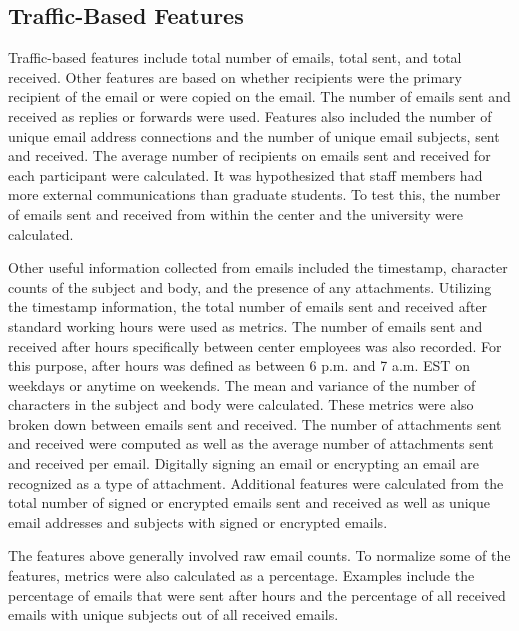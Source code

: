 \documentclass[10pt,twocolumn,conference]{IEEEtran}
\begin{document}
\subsection{Traffic-Based Features}
Traffic-based features include total number of emails, total sent, and total received.
Other features are based on whether recipients were the primary recipient of the email or were copied on the email.
The number of emails sent and received as replies or forwards were used.
Features also included the number of unique email address connections and the number of unique email subjects, sent and received.
The average number of recipients on emails sent and received for each participant were calculated.
It was hypothesized that staff members had more external communications than graduate students.
To test this, the number of emails sent and received from within the center and the university were calculated.  

Other useful information collected from emails included the timestamp, character counts of the subject and body, and the presence of any attachments.
Utilizing the timestamp information, the total number of emails sent and received after standard working hours were used as metrics.
The number of emails sent and received after hours specifically between center employees was also recorded.
For this purpose, after hours was defined as between 6 p.m. and 7 a.m. EST on weekdays or anytime on weekends.
The mean and variance of the number of characters in the subject and body were calculated.
These metrics were also broken down between emails sent and received.
The number of attachments sent and received were computed as well as the average number of attachments sent and received per email.
Digitally signing an email or encrypting an email are recognized as a type of attachment.
Additional features were calculated from the total number of signed or encrypted emails sent and received as well as unique email addresses and subjects with signed or encrypted emails.

The features above generally involved raw email counts.
To normalize some of the features, metrics were also calculated as a percentage.
Examples include the percentage of emails that were sent after hours and the percentage of all received emails with unique subjects out of all received emails.
\end{document}
